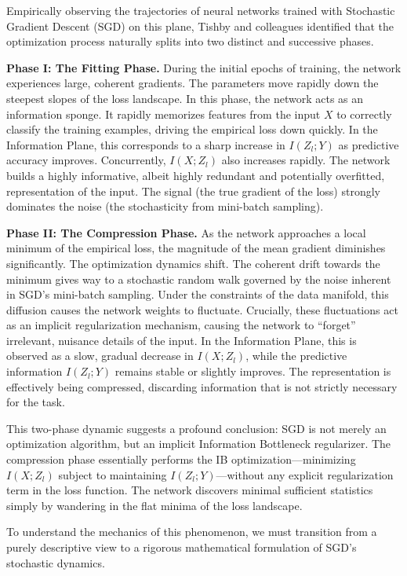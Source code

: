 Empirically observing the trajectories of neural networks trained with Stochastic Gradient Descent (SGD) on this plane, Tishby and colleagues identified that the optimization process naturally splits into two distinct and successive phases.

\textbf{Phase I: The Fitting Phase.} During the initial epochs of training, the network experiences large, coherent gradients. The parameters move rapidly down the steepest slopes of the loss landscape. In this phase, the network acts as an information sponge. It rapidly memorizes features from the input $X$ to correctly classify the training examples, driving the empirical loss down quickly. In the Information Plane, this corresponds to a sharp increase in $I(Z_l; Y)$ as predictive accuracy improves. Concurrently, $I(X; Z_l)$ also increases rapidly. The network builds a highly informative, albeit highly redundant and potentially overfitted, representation of the input. The signal (the true gradient of the loss) strongly dominates the noise (the stochasticity from mini-batch sampling).

\textbf{Phase II: The Compression Phase.} As the network approaches a local minimum of the empirical loss, the magnitude of the mean gradient diminishes significantly. The optimization dynamics shift. The coherent drift towards the minimum gives way to a stochastic random walk governed by the noise inherent in SGD's mini-batch sampling. Under the constraints of the data manifold, this diffusion causes the network weights to fluctuate. Crucially, these fluctuations act as an implicit regularization mechanism, causing the network to ``forget'' irrelevant, nuisance details of the input. In the Information Plane, this is observed as a slow, gradual decrease in $I(X; Z_l)$, while the predictive information $I(Z_l; Y)$ remains stable or slightly improves. The representation is effectively being compressed, discarding information that is not strictly necessary for the task.

This two-phase dynamic suggests a profound conclusion: SGD is not merely an optimization algorithm, but an implicit Information Bottleneck regularizer. The compression phase essentially performs the IB optimization---minimizing $I(X; Z_l)$ subject to maintaining $I(Z_l; Y)$---without any explicit regularization term in the loss function. The network discovers minimal sufficient statistics simply by wandering in the flat minima of the loss landscape. 

To understand the mechanics of this phenomenon, we must transition from a purely descriptive view to a rigorous mathematical formulation of SGD's stochastic dynamics.

